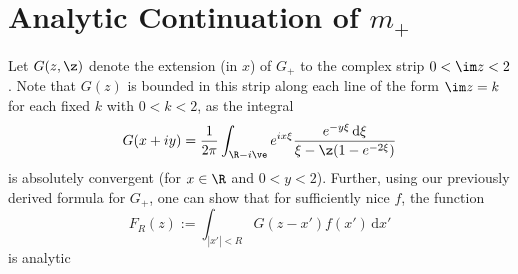 \documentclass[GreensFunctions.tex]{subfiles}
\begin{document}
\section{Analytic Continuation of $m_+$}

Let $G(z, \z)$ denote the extension (in $x$) of $G_+$ to the complex strip
$0 < \im z < 2$. Note that $G(z)$ is bounded in this strip along each 
line of the form $\im z = k$ for each fixed $k$ with $0 < k < 2$,
as the integral
\[
	G(x + iy) 
		= \frac{1}{2 \pi} \int_{\R - i \ve} e^{ix \xi} 
				\frac{e^{-y\xi} \, \mathrm{d}\xi}{\xi - \z (1-e^{-2\xi})}
\]
is absolutely convergent (for $x \in \R$ and $0 < y < 2$). Further, 
using our previously derived formula for $G_+$, one can show that for
sufficiently nice $f$, the function
\[
	F_R(z) := \int_{|x'| < R} G(z - x') f(x') \, \mathrm{d}x'
\]
is analytic



\end{document}
